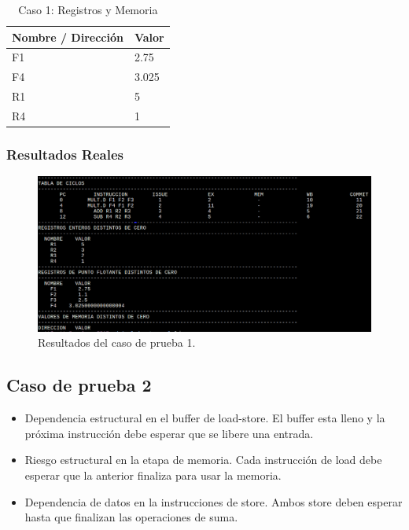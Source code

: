 \documentclass[a4paper]{article}
\begin{document}
	\begin{table}[H]
		\centering
		\caption*{Caso 1: Registros y Memoria}
		\begin{tabular}{|l|l|}
		\hline
		\textbf{Nombre / Dirección} & \textbf{Valor} \\ \hline
		F1                          & 2.75           \\ \hline
		F4                          & 3.025          \\ \hline
		R1                          & 5              \\ \hline
		R4                          & 1              \\ \hline
		\end{tabular}
	\end{table}

	\subsubsection*{Resultados Reales}

	\begin{figure}[H]
	\centering
	\includegraphics[width=1\textwidth]{figures/test1.png}
	\caption{\label{fig:bloques}Resultados del caso de prueba 1.}
	\end{figure}


	\subsection*{Caso de prueba 2}

	\begin{itemize}
		\item Dependencia estructural en el buffer de load-store. El buffer esta lleno y la próxima instrucción debe esperar que se libere una entrada. 
		\item Riesgo estructural en la etapa de memoria. Cada instrucción de load debe esperar que la anterior finaliza para usar la memoria.
		\item Dependencia de datos en la instrucciones de store. Ambos store deben esperar hasta que finalizan las operaciones de suma.
	\end{itemize}
\end{document}
